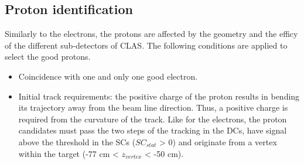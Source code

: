 \subsection{Proton identification}
Similarly to the electrons, the protons are affected by the geometry and the efficy of the different sub-detectors of CLAS. The following conditions are applied to select the good protons.
\begin{itemize}
\item Coincidence with one and only one good electron.
 
\item Initial track requirements: the positive charge of the proton results in bending its trajectory away from the beam line direction. Thus, a positive charge is required from the curvature of the track. Like for the electrons, the proton candidates must pass the two steps of the tracking in the DCs, have signal above the threshold in the SCs ($SC_{stat}$ > 0) and originate from a vertex within the target (-77 cm < $z_{vertex}$ < -50 cm). 


\end{itemize}
